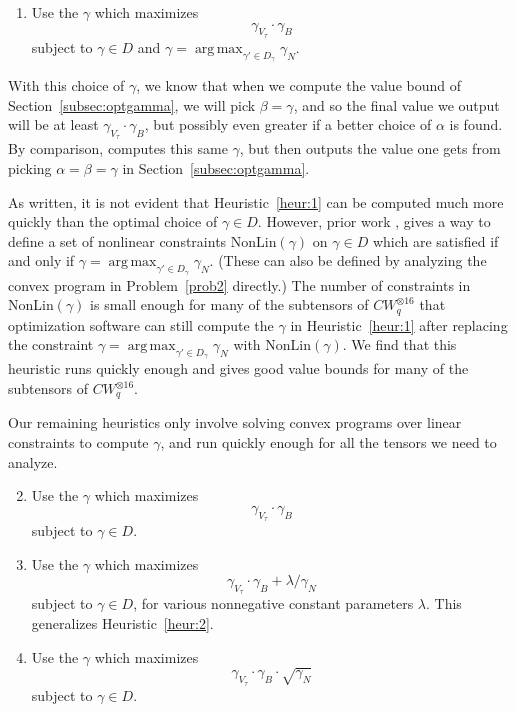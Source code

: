 \PassOptionsToPackage{shortlabels}{enumitem}\documentclass[10pt,a4paper]{article}
\DeclareMathOperator*{\argmax}{arg\,max}
\begin{document}
\begin{enumerate}[label={\lsstyle\interextrabold\fontsize{12}{12}\selectfont HEURISTIC \arabic*.},  align= left, itemsep=1em, labelindent = 0em,ref=\arabic*]  
\item \label{heur:1} Use the $\gamma$ which maximizes $$\gamma_{V_\tau} \cdot \gamma_B$$ subject to $\gamma \in D$ and $\gamma = \argmax_{\gamma' \in D_\gamma} \gamma_N$.
\end{enumerate}
With this choice of $\gamma$, we know that when we compute the value bound of Section~\ref{subsec:optgamma}, we will pick $\beta = \gamma$, and so the final value we output will be at least $\gamma_{V_\tau} \cdot \gamma_B$, but possibly even greater if a better choice of $\alpha$ is found. By comparison, \cite[{Algorithm~B}]{legall} computes this same $\gamma$, but then outputs the value one gets from picking $\alpha=\beta=\gamma$ in Section~\ref{subsec:optgamma}.

As written, it is not evident that Heuristic~\ref{heur:1} can be computed much more quickly than the optimal choice of $\gamma \in D$.
However, prior work \cite[{Figure~1}]{v12}, \cite[{Proposition~4.1}]{legall} gives a way to define a set of nonlinear constraints NonLin$(\gamma)$ on $\gamma \in D$ which are satisfied if and only if $\gamma = \argmax_{\gamma' \in D_\gamma} \gamma_N$. (These can also be defined by analyzing the convex program in Problem~\ref{prob2} directly.) The number of constraints in NonLin$(\gamma)$ is small enough for many of the subtensors of $CW_q^{\otimes 16}$ that optimization software can still compute the $\gamma$ in Heuristic~\ref{heur:1} after replacing the constraint $\gamma = \argmax_{\gamma' \in D_\gamma} \gamma_N$ with NonLin$(\gamma)$. We find that this heuristic runs quickly enough and gives good value bounds for many of the subtensors of $CW_q^{\otimes 16}$.

Our remaining heuristics only involve solving convex programs over linear constraints to compute $\gamma$, and run quickly enough for all the tensors we need to analyze.



\begin{enumerate}[label={\lsstyle\interextrabold\fontsize{12}{12}\selectfont HEURISTIC \arabic*.},  align= left, itemsep=1em, labelindent = 0em,ref=\arabic*]  \setcounter{enumi}{1}
     \item \label{heur:2} Use the $\gamma$ which maximizes  $$\gamma_{V_\tau} \cdot \gamma_B$$ subject to $\gamma \in D$.
     \item\label{heur:3} Use the $\gamma$ which maximizes  $$\gamma_{V_\tau} \cdot \gamma_B + \lambda/\gamma_N$$ subject to $\gamma \in D$, for various nonnegative constant parameters $\lambda$. This generalizes Heuristic~\ref{heur:2}. 
     \item\label{heur:4} Use the $\gamma$ which maximizes  $$\gamma_{V_\tau} \cdot \gamma_B \cdot \sqrt{\gamma_N}$$ subject to $\gamma \in D$.
\end{enumerate}
\end{document}
